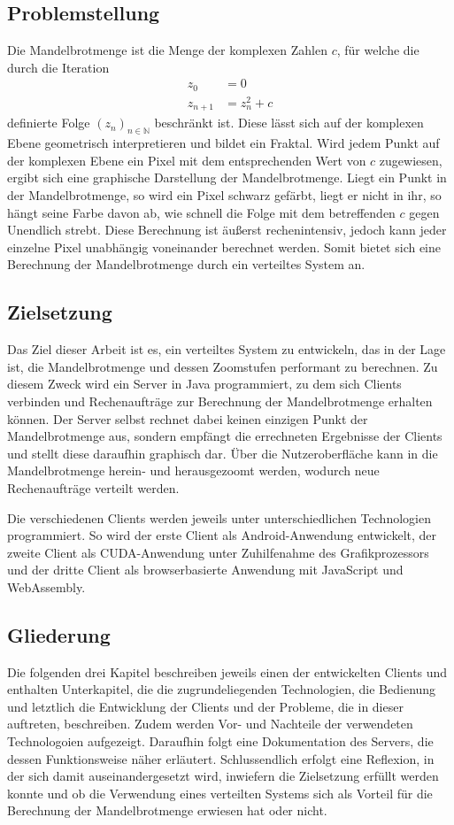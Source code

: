\documentclass[12pt, onecolumn, notitlepage]{scrartcl}
\begin{document}
\subsection{Problemstellung}
Die Mandelbrotmenge ist die Menge der komplexen Zahlen $c$, für welche die durch die Iteration \begin{align*}
z_{ 0 } &= 0  \\
z_{ n+1 } &= z_{ n }^{ 2 } + c
\end{align*}
definierte Folge $(z_{ n })_{ n\in \mathbb{N} }$ beschränkt ist. Diese lässt sich auf der komplexen Ebene geometrisch interpretieren und bildet ein Fraktal. Wird jedem Punkt auf der komplexen Ebene ein Pixel mit dem entsprechenden Wert von $c$ zugewiesen, ergibt sich eine graphische Darstellung der Mandelbrotmenge. Liegt ein Punkt in der Mandelbrotmenge, so wird ein Pixel schwarz gefärbt, liegt er nicht in ihr, so hängt seine Farbe davon ab, wie schnell die Folge mit dem betreffenden $c$ gegen Unendlich strebt. Diese Berechnung ist äußerst rechenintensiv, jedoch kann jeder einzelne Pixel unabhängig voneinander berechnet werden. Somit bietet sich eine Berechnung der Mandelbrotmenge durch ein verteiltes System an.
\subsection{Zielsetzung}
Das Ziel dieser Arbeit ist es, ein verteiltes System zu entwickeln, das in der Lage ist, die Mandelbrotmenge und dessen Zoomstufen performant zu berechnen. Zu diesem Zweck wird ein Server in Java programmiert, zu dem sich Clients verbinden und Rechenaufträge zur Berechnung der Mandelbrotmenge erhalten können. Der Server selbst rechnet dabei keinen einzigen Punkt der Mandelbrotmenge aus, sondern empfängt die errechneten Ergebnisse der Clients und stellt diese daraufhin graphisch dar. Über die Nutzeroberfläche kann in die Mandelbrotmenge herein- und herausgezoomt werden, wodurch neue Rechenaufträge verteilt werden. \par
Die verschiedenen Clients werden jeweils unter unterschiedlichen Technologien programmiert. So wird der erste Client als Android-Anwendung entwickelt, der zweite Client als CUDA-Anwendung unter Zuhilfenahme des Grafikprozessors und der dritte Client als browserbasierte Anwendung mit JavaScript und WebAssembly. 
\subsection{Gliederung}
Die folgenden drei Kapitel beschreiben jeweils einen der entwickelten Clients und enthalten Unterkapitel, die die zugrundeliegenden Technologien, die Bedienung und letztlich die Entwicklung der Clients und der Probleme, die in dieser auftreten, beschreiben. Zudem werden Vor- und Nachteile der verwendeten Technologoien aufgezeigt.
Daraufhin folgt eine Dokumentation des Servers, die dessen Funktionsweise näher erläutert. Schlussendlich erfolgt eine Reflexion, in der sich damit auseinandergesetzt wird, inwiefern die Zielsetzung erfüllt werden konnte und ob die Verwendung eines verteilten Systems sich als Vorteil für die Berechnung der Mandelbrotmenge erwiesen hat oder nicht.
\end{document}
